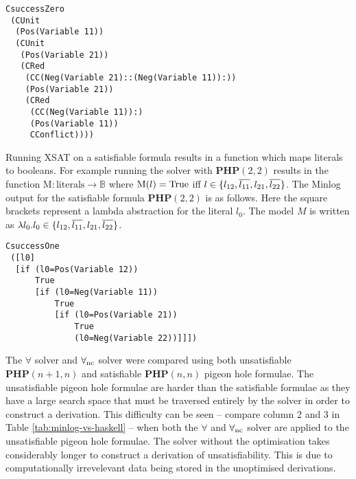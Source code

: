 \begin{lstlisting}[caption = "The derivation produce by XSAT for PHP(2\,1)"]
CsuccessZero
 (CUnit
  (Pos(Variable 11))
  (CUnit
   (Pos(Variable 21))
   (CRed
    (CC(Neg(Variable 21)::(Neg(Variable 11)):))
    (Pos(Variable 21))
    (CRed
     (CC(Neg(Variable 11)):)
     (Pos(Variable 11))
     CConflict))))
\end{lstlisting}

Running XSAT on a satisfiable formula results in a function which 
maps literals to booleans. For example running the solver with 
$\mathbf{PHP}(2,2)$ results in the function  
	 $\mathrm{M}: \mathrm{literals} \to \mathbb{B}$  where  
$\mathrm{M}(l) = \mathrm{True}$ iff  $l \in \{ l_{12}, \overline{ l_{11}}, l_{21}, \overline{ l_{22}}  \}$.
The Minlog output for the satisfiable formula $\mathbf{PHP}(2,2)$ is as follows. Here the square brackets represent a lambda abstraction for the literal $l_0$. The model $M$ is written as $\lambda l_0 . l_0 \in \{ l_{12}, \overline{l_{11}},l_{21}, \overline{l_{22}} \}$.
\begin{lstlisting}[caption = "The model produced by XSAT for PHP(2\,2)"]
CsuccessOne
 ([l0]
  [if (l0=Pos(Variable 12))
      True 
      [if (l0=Neg(Variable 11)) 
          True 
          [if (l0=Pos(Variable 21)) 
              True 
              (l0=Neg(Variable 22))]]])
\end{lstlisting}
%
%
The $\forall$ solver and $\forall_{\mathrm{nc}}$ solver were compared using both unsatisfiable  $\mathbf{PHP}(n+1, n)$ and satisfiable $\mathbf{PHP}(n,n)$ pigeon hole formulae. The unsatisfiable pigeon hole formulae are harder than the satisfiable formulae as they have a large search space that must be traversed entirely by the solver in order to construct a derivation.
%
This difficulty can be seen -- compare column 2 and 3 in Table 
\ref{tab:minlog-vs-haskell} %
-- when both the $\forall$ and $\forall_{\mathrm{nc}}$ solver are applied to the unsatisfiable pigeon hole formulae. The solver without the optimisation takes considerably longer to construct a derivation of unsatisfiability. This is due to computationally irrevelevant data being stored in the unoptimised derivations. \medskip \\ 
